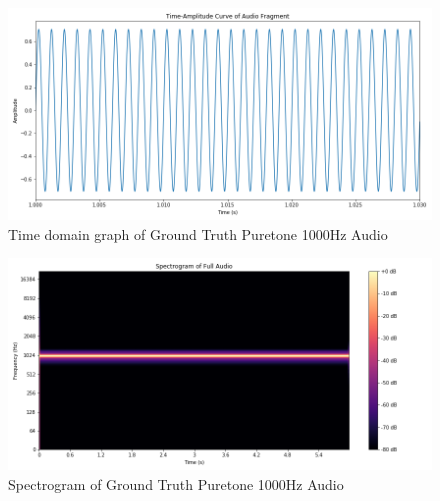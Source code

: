 \documentclass{ioereport}
\begin{document}
    \begin{figure}[H]
        \centering
        \includegraphics[width=\linewidth]{assets/audio_results/puretone1000hztime.png}
        \caption{Time domain graph of Ground Truth Puretone 1000Hz Audio}
        \label{fig:gt-pure1000-time}
    \end{figure}
    \begin{figure}[H]
        \centering
        \includegraphics[width=\linewidth]{assets/audio_results/puretone1000hzspec.png}
        \caption{Spectrogram of Ground Truth Puretone 1000Hz Audio}
        \label{fig:gt-pure1000-spec}
    \end{figure}
    
\end{document}
